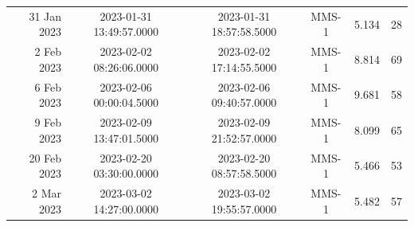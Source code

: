 \begin{longtable}{r|ccccc}
31 Jan 2023    &  2023-01-31 13:49:57.0000 &  2023-01-31 18:57:58.5000 &  MMS-1 &    5.134 &     28 \\
2 Feb 2023     &  2023-02-02 08:26:06.0000 &  2023-02-02 17:14:55.5000 &  MMS-1 &    8.814 &     69 \\
6 Feb 2023     &  2023-02-06 00:00:04.5000 &  2023-02-06 09:40:57.0000 &  MMS-1 &    9.681 &     58 \\
9 Feb 2023     &  2023-02-09 13:47:01.5000 &  2023-02-09 21:52:57.0000 &  MMS-1 &    8.099 &     65 \\
20 Feb 2023    &  2023-02-20 03:30:00.0000 &  2023-02-20 08:57:58.5000 &  MMS-1 &    5.466 &     53 \\
2 Mar 2023     &  2023-03-02 14:27:00.0000 &  2023-03-02 19:55:57.0000 &  MMS-1 &    5.482 &     57 \\
\hline
\end{longtable}
